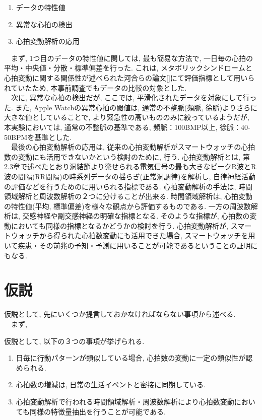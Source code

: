 \documentclass[report, 11pt, a4paper]{jsbook}
\begin{document}
\begin{enumerate}
  \item データの特性値
  \item 異常な心拍の検出
  \item 心拍変動解析の応用
\end{enumerate}

　まず, 1つ目のデータの特性値に関しては, 最も簡易な方法で, 一日毎の心拍の平均・中央値・分散・標準偏差を行った. これは, メタボリックシンドロームと心拍変動に関する関係性が述べられた河合らの論文[]にて評価指標として用いられていたため, 本事前調査でもデータの比較の対象とした. \\
　次に, 異常な心拍の検出だが, ここでは, 平滑化されたデータを対象にして行った. また, Apple Watchの異常心拍の閾値は, 通常の不整脈(頻脈, 徐脈)よりさらに大きな値としていることで, より緊急性の高いもののみに絞っているようだが, 本実験においては, 通常の不整脈の基準である, 頻脈：100BMP以上, 徐脈：40-50BPMを基準とした. \\
　最後の心拍変動解析の応用は, 従来の心拍変動解析がスマートウォッチの心拍数の変動にも活用できないかという検討のために, 行う. 心拍変動解析とは, 第2.3章で述べたとおり洞結節より発せられる電気信号の最も大きなピークR波とR波の間隔(RR間隔)の時系列データの揺らぎ(正常洞調律)を解析し, 自律神経活動の評価などを行うためのに用いられる指標である. 心拍変動解析の手法は, 時間領域解析と周波数解析の２つに分けることが出来る. 時間領域解析は, 心拍変動の特性値(平均, 標準偏差)を様々な観点から評価するものである. 一方の周波数解析は, 交感神経や副交感神経の明確な指標となる. そのような指標が, 心拍数の変動においても同様の指標となるかどうかの検討を行う.  心拍変動解析が, スマートウォッチから得られた心拍数変動にも活用できた場合, スマートウォッチを用いて疾患・その前兆の予知・予測に用いることが可能であるということの証明にもなる. 

\section{仮説}
仮説として, 先にいくつか提言しておかなければならない事項から述べる. \\
　まず, 

仮説として, 以下の３つの事項が挙げられる. 

\begin{enumerate}
  \item 日毎に行動パターンが類似している場合, 心拍数の変動に一定の類似性が認められる.
  \item 心拍数の増減は, 日常の生活イベントと密接に同期している. 
  \item 心拍変動解析で行われる時間領域解析・周波数解析により心拍数変動においても同様の特徴量抽出を行うことが可能である.
\end{enumerate}
\end{document}
